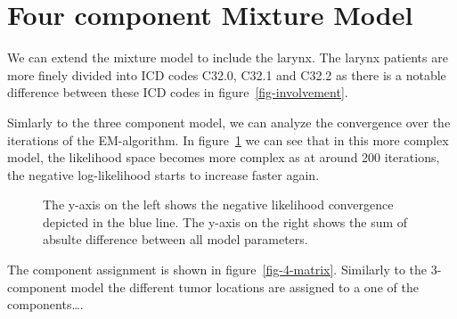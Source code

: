 \documentclass[
  sn-mathphys-num,
]{sn-jnl}
\begin{document}
\section{Four component Mixture Model}\label{sec-4comp}

We can extend the mixture model to include the larynx. The larynx
patients are more finely divided into ICD codes C32.0, C32.1 and C32.2
as there is a notable difference between these ICD codes in
figure~\ref{fig-involvement}.

Simlarly to the three component model, we can analyze the convergence
over the iterations of the EM-algorithm. In
figure~\ref{fig-convergence4} we can see that in this more complex
model, the likelihood space becomes more complex as at around 200
iterations, the negative log-likelihood starts to increase faster again.

\begin{figure}


\caption{\label{fig-convergence4}The y-axis on the left shows the
negative likelihood convergence depicted in the blue line. The y-axis on
the right shows the sum of absulte difference between all model
parameters.}

\end{figure}%

The component assignment is shown in figure~\ref{fig-4-matrix}.
Similarly to the 3-component model the different tumor locations are
assigned to a one of the components\ldots.
\end{document}
